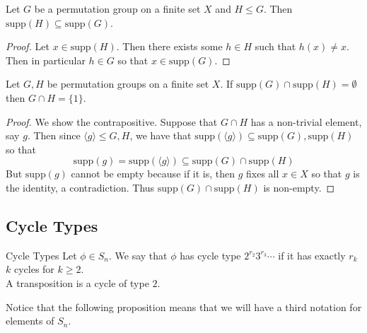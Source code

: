 \documentclass[a4paper]{article}
\begin{document}
\begin{lmm}{}{} Let $G$ be a permutation group on a finite set $X$ and $H\leq G$. Then $\text{supp}(H)\subseteq\text{supp}(G)$. 
\begin{proof}
Let $x\in\text{supp}(H)$. Then there exists some $h\in H$ such that $h(x)\neq x$. Then in particular $h\in G$ so that $x\in\text{supp}(G)$. 
\end{proof}
\end{lmm}

\begin{prp}{}{} Let $G,H$ be permutation groups on a finite set $X$. If $\text{supp}(G)\cap\text{supp}(H)=\emptyset$ then $G\cap H=\{1\}$. 
\begin{proof}
We show the contrapositive. Suppose that $G\cap H$ has a non-trivial element, say $g$. Then since $\langle g\rangle\leq G,H$, we have that $\text{supp}(\langle g\rangle)\subseteq\text{supp}(G),\text{supp}(H)$ so that $$\text{supp}(g)=\text{supp}(\langle g\rangle)\subseteq\text{supp}(G)\cap\text{supp}(H)$$ But $\text{supp}(g)$ cannot be empty because if it is, then $g$ fixes all $x\in X$ so that $g$ is the identity, a contradiction. Thus $\text{supp}(G)\cap\text{supp}(H)$ is non-empty. 
\end{proof}
\end{prp}

\subsection{Cycle Types}
\begin{defn}{Cycle Types}{} Let $\phi\in S_n$. We say that $\phi$ has cycle type $2^{r_2}3^{r_3}\cdots$ if it has exactly $r_k$ $k$ cycles for $k\geq 2$. \\
A transposition is a cycle of type $2$. 
\end{defn}

Notice that the following proposition means that we will have a third notation for elements of $S_n$. 
\end{document}
